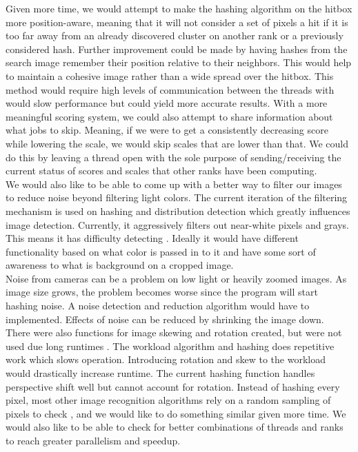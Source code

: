 \documentclass[10pt, journal]{vgtc}                %
\begin{document}
\begin{flushleft}
Given more time, we would attempt to make the hashing algorithm on the hitbox more position-aware, meaning that it will not consider a set of pixels a hit if it is too far away from an already discovered cluster on another rank or a previously considered hash. Further improvement could be made by having hashes from the search image remember their position relative to their neighbors. This would help to maintain a cohesive image rather than a wide spread over the hitbox. This method would require high levels of communication between the threads with would slow performance but could yield more accurate results. With a more meaningful scoring system, we could also attempt to share information about what jobs to skip. Meaning, if we were to get a consistently decreasing score while lowering the scale, we would skip scales that are lower than that. We could do this by leaving a thread open with the sole purpose of sending/receiving the current status of scores and scales that other ranks have been computing. \\\smallskip
We would also like to be able to come up with a better way to filter our images to reduce noise beyond filtering light colors. The current iteration of the filtering mechanism is used on hashing and distribution detection which greatly influences image detection. Currently, it aggressively filters out near-white pixels and grays. This means it has difficulty detecting . Ideally it would have different functionality based on what color is passed in to it and have some sort of awareness to what is background on a cropped image.  \\\smallskip
Noise from cameras can be a problem on low light or heavily zoomed images. As image size grows, the problem becomes worse since the program will start hashing noise. A noise detection and reduction algorithm would have to implemented. Effects of noise can be reduced by shrinking the image down. \\\smallskip
There were also functions for image skewing and rotation created, but were not used due long runtimes \cite{Paeth:1990:FAG:90767.90811}. The workload algorithm and hashing does repetitive work which slows operation. Introducing rotation and skew to the workload would drastically increase runtime. The current hashing function handles perspective shift well but cannot account for rotation.
Instead of hashing every pixel, most other image recognition algorithms rely on a random sampling of pixels to check \cite{7838673,1634363}, and we would like to do something similar given more time. We would also like to be able to check for better combinations of threads and ranks to reach greater parallelism and speedup. 

\end{flushleft}
\end{document}
